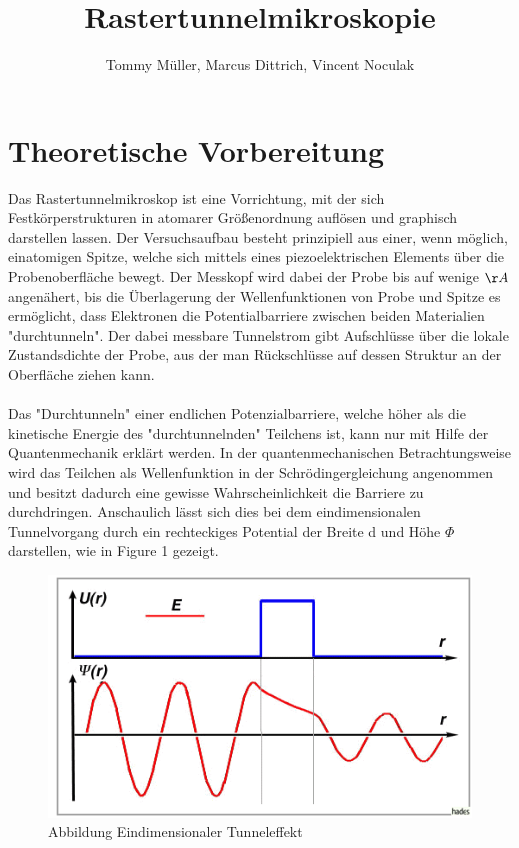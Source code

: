 \documentclass[10pt,a4paper]{article}
\author{Tommy Müller, Marcus Dittrich, Vincent Noculak}
\title{Rastertunnelmikroskopie}
\begin{document}
	
	\maketitle
	\newpage
	\tableofcontents
	\newpage
	
	\section{ Theoretische Vorbereitung}
	
	Das Rastertunnelmikroskop ist eine Vorrichtung, mit der sich Festkörperstrukturen in atomarer Größenordnung auflösen und graphisch darstellen lassen. Der Versuchsaufbau besteht prinzipiell aus einer, wenn möglich, einatomigen Spitze, welche sich mittels eines piezoelektrischen Elements über die Probenoberfläche bewegt. Der Messkopf wird dabei der Probe bis auf wenige $\AA$ angenähert, bis die Überlagerung der Wellenfunktionen von Probe und Spitze es ermöglicht, dass Elektronen die Potentialbarriere zwischen beiden Materialien "durchtunneln". Der dabei messbare Tunnelstrom gibt Aufschlüsse über die lokale Zustandsdichte der Probe, aus der man Rückschlüsse auf dessen Struktur an der Oberfläche ziehen kann. \\ \\Das "Durchtunneln" einer endlichen Potenzialbarriere, welche höher als die kinetische Energie des "durchtunnelnden" Teilchens ist, kann nur mit Hilfe der Quantenmechanik erklärt werden. In der quantenmechanischen Betrachtungsweise wird das Teilchen als Wellenfunktion in der Schrödingergleichung angenommen und besitzt dadurch eine gewisse Wahrscheinlichkeit die Barriere zu durchdringen. Anschaulich lässt sich dies bei dem eindimensionalen Tunnelvorgang durch ein rechteckiges Potential der Breite d und Höhe $\Phi$ darstellen, wie in Figure 1 gezeigt.
	\begin{figure}[h]
		\includegraphics[scale = 0.8]{tunnel.png}
		\centering
		\caption{Abbildung Eindimensionaler Tunneleffekt}
		\label{diagramm_aufspaltung}
	\end{figure}
\end{document}
